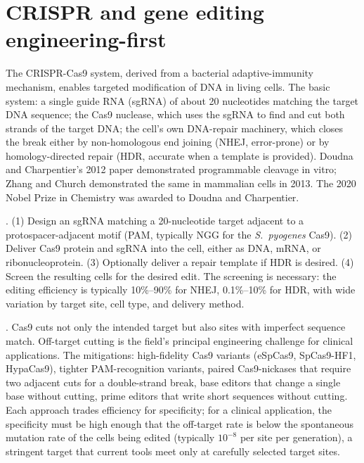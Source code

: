 \section{CRISPR and gene editing engineering-first}

The CRISPR-Cas9 system, derived from a bacterial adaptive-immunity
mechanism, enables targeted modification of DNA in living cells. The
basic system: a single guide RNA (sgRNA) of about 20 nucleotides
matching the target DNA sequence; the Cas9 nuclease, which uses the
sgRNA to find and cut both strands of the target DNA; the cell's
own DNA-repair machinery, which closes the break either by
non-homologous end joining (NHEJ, error-prone) or by homology-directed
repair (HDR, accurate when a template is provided). Doudna and
Charpentier's 2012 paper \cite[pp.~816--821]{paper:v6c09-jinek-crispr-2012}
demonstrated programmable cleavage in vitro; Zhang and Church
demonstrated the same in mammalian cells in 2013. The 2020 Nobel
Prize in Chemistry was awarded to Doudna and Charpentier.

. (1) Design an sgRNA matching a
20-nucleotide target adjacent to a protospacer-adjacent motif (PAM,
typically NGG for the \emph{S.\ pyogenes} Cas9). (2) Deliver Cas9
protein and sgRNA into the cell, either as DNA, mRNA, or
ribonucleoprotein. (3) Optionally deliver a repair template if HDR
is desired. (4) Screen the resulting cells for the desired edit.
The screening is necessary: the editing efficiency is typically
10\%--90\% for NHEJ, 0.1\%--10\% for HDR, with wide variation by
target site, cell type, and delivery method.


. Cas9 cuts not only the intended target
but also sites with imperfect sequence match. Off-target cutting is
the field's principal engineering challenge for clinical
applications. The mitigations: high-fidelity Cas9 variants (eSpCas9,
SpCas9-HF1, HypaCas9), tighter PAM-recognition variants, paired
Cas9-nickases that require two adjacent cuts for a double-strand
break, base editors that change a single base without cutting, prime
editors that write short sequences without cutting. Each approach
trades efficiency for specificity; for a clinical application, the
specificity must be high enough that the off-target rate is below
the spontaneous mutation rate of the cells being edited (typically
$10^{-8}$ per site per generation), a stringent target that current
tools meet only at carefully selected target sites.


